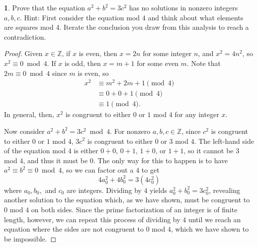 \documentclass[12pt]{article}
\theoremstyle{definition}
\newtheorem{ex}{}
\begin{document}
\begin{ex}
	Prove that the equation $a^2 + b^2 = 3c^2$ has no solutions in nonzero integers $a, b, c$.
	Hint: First consider the equation mod 4 and think about what elements are squares mod 4.
	Iterate the conclusion you draw from this analysis to reach a contradiction.
\end{ex}
\begin{proof}
	Given $x \in \mathbb{Z}$, if $x$ is even, then $x = 2n$ for some integer $n$, and $x^2 = 4n^2$, so $x^2 \equiv 0 \bmod 4$.
	If $x$ is odd, then $x = m + 1$ for some even $m$.
	Note that $2m \equiv 0 \bmod 4$ since $m$ is even, so \begin{align*}
		x^2 & \equiv m^2 + 2m + 1 \pmod 4 \\
		    & \equiv 0 + 0 + 1 \pmod 4    \\
		    & \equiv 1 \pmod 4.
	\end{align*}
	In general, then, $x^2$ is congruent to either $0$ or $1$ mod $4$ for any integer $x$.

	Now consider $a^2 + b^2 = 3c^2 \bmod 4$.
	For nonzero $a, b, c \in \mathbb{Z}$, since $c^2$ is congruent to either $0$ or $1$ mod $4$, $3c^2$ is congruent to either $0$ or $3$ mod $4$.
	The left-hand side of the equation mod $4$ is either $0 + 0$, $0 + 1$, $1 + 0$, or $1 + 1$, so it cannot be $3$ mod $4$, and thus it must be $0$.
	The only way for this to happen is to have $a^2 \equiv b^2 \equiv 0 \bmod 4$, so we can factor out a $4$ to get \begin{equation*}
		4a_0^2 + 4b_0^2 = 3(4c_0^2)
	\end{equation*}
	where $a_0, b_0,$ and $c_0$ are integers.
	Dividing by $4$ yields $a_0^2 + b_0^2 = 3c_0^2$, revealing another solution to the equation which, as we have shown, must be congruent to $0$ mod $4$ on both sides.
	Since the prime factorization of an integer is of finite length, however, we can repeat this process of dividing by $4$ until we reach an equation where the sides are not congruent to $0$ mod $4$, which we have shown to be impossible.
\end{proof}
\end{document}
